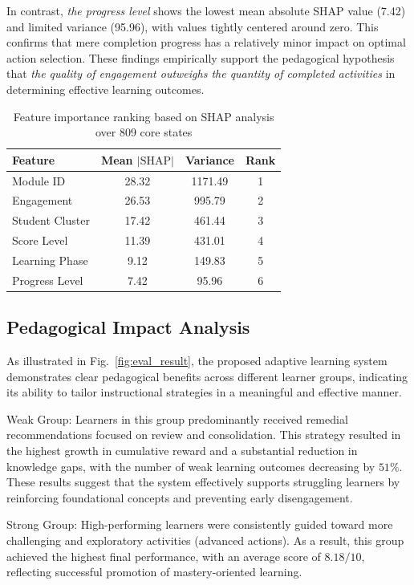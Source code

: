 \documentclass[9pt, conference, a4paper, compsocconf]{IEEEtran}
\begin{document}
In contrast, \textit{the progress level} shows the lowest mean absolute SHAP value (7.42) and limited variance (95.96), with values tightly centered around zero. This confirms that mere completion progress has a relatively minor impact on optimal action selection. These findings empirically support the pedagogical hypothesis that \emph{the quality of engagement outweighs the quantity of completed activities} in determining effective learning outcomes.

\begin{table}[t]
\caption{Feature importance ranking based on SHAP analysis over 809 core states}
\label{tab:shap_importance}
\begin{center}
\small
\begin{tabular}{lccc}
\toprule
\textbf{Feature} & \textbf{Mean $|\text{SHAP}|$} & \textbf{Variance} & \textbf{Rank} \\
\midrule
Module ID & 28.32 & 1171.49 & 1 \\
Engagement & 26.53 & 995.79 & 2 \\
Student Cluster & 17.42 & 461.44 & 3 \\
Score Level & 11.39 & 431.01 & 4 \\
Learning Phase & 9.12 & 149.83 & 5 \\
Progress Level & 7.42 & 95.96 & 6 \\
\bottomrule
\end{tabular}
\end{center}
\end{table}

\subsection{Pedagogical Impact Analysis}
As illustrated in Fig.~\ref{fig:eval_result}, the proposed adaptive learning system demonstrates clear pedagogical benefits across different learner groups, indicating its ability to tailor instructional strategies in a meaningful and effective manner.

Weak Group: Learners in this group predominantly received remedial recommendations focused on review and consolidation. This strategy resulted in the highest growth in cumulative reward and a substantial reduction in knowledge gaps, with the number of weak learning outcomes decreasing by $51\%$. These results suggest that the system effectively supports struggling learners by reinforcing foundational concepts and preventing early disengagement.

Strong Group: High-performing learners were consistently guided toward more challenging and exploratory activities (advanced actions). As a result, this group achieved the highest final performance, with an average score of $8.18/10$, reflecting successful promotion of mastery-oriented learning.
\end{document}
